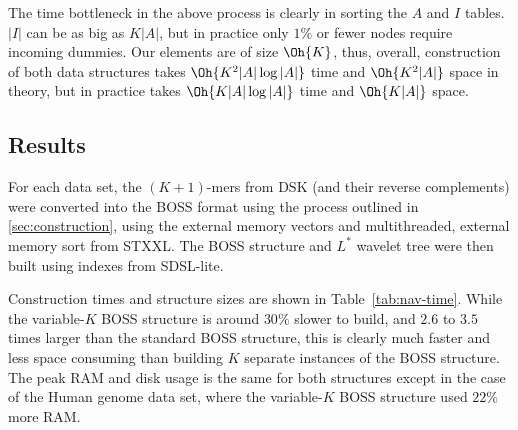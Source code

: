 The time bottleneck in the above process is clearly in sorting the $A$ and $I$ tables. $|I|$ can be as big as $K|A|$, but in practice only $1\%$ or fewer
nodes require incoming dummies. Our elements are of size $\Oh{K}$, thus, overall, construction of both data structures takes $\Oh{K^2|A|\log|A|}$ time
and $\Oh{K^2|A|}$ space in theory, but in practice takes $\Oh{K|A|\log|A|}$ time and $\Oh{K|A|}$ space.




\subsection{Results}

For each data set, the $(K+1)$-mers from DSK (and their reverse complements) were converted into the BOSS format
using the process outlined in \ref{sec:construction}, using the external memory vectors and multithreaded, external
memory sort from STXXL. The BOSS structure and $L^{*}$ wavelet tree were then built using indexes from SDSL-lite.

Construction times and structure sizes are shown in Table~\ref{tab:nav-time}.
While the variable-$K$ BOSS structure is around $30\%$ slower to build, and $2.6$ to $3.5$ times larger 
than the standard BOSS structure, this is clearly much faster and less space consuming than building 
$K$ separate instances of the BOSS structure. The peak RAM and disk usage is the same for both structures
except in the case of the Human genome data set, where the variable-$K$ BOSS structure used $22\%$ more RAM.


